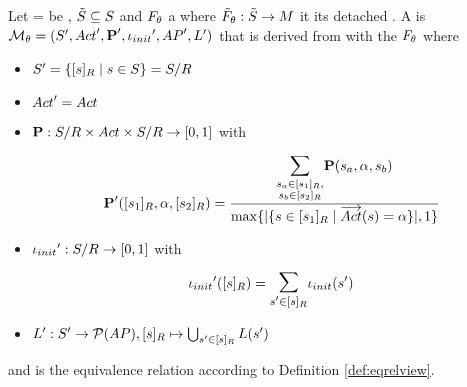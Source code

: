 \documentclass[preview]{standalone}
\begin{document}
\begin{definition}
	
	Let \chgph = \chgphtuple be \chgphN, ${\tilde{{S}}} \subseteq {S}$ and ${F_{{\theta}}}$ a \grpfctN where ${\tilde{F}_{{\theta}}} : {\tilde{{S}}} \to {\ensuremath{{M}}}$ it its detached \grpfctN. A \emph{\viewN} is \achgphN ${{{{\mathcal{M}}}}_{{\theta}}} = {{({S}', {Act}', {\textbf{P}}', {\iota_{init}}', {AP}', {L}')}}$ that is derived from \mdp with the \grpfctN ${F_{{\theta}}}$ where
	
	\begin{itemize}
				\item ${S}' = \{ {[{s}]_{{R}}} \mid {s} \in {S} \} = {{{S}}/{R}}$
				
				\item ${Act}' = {Act}$
				
				
				\item ${\textbf{P}} : {{{S}}/{R}} \times {Act} \times {{\ensuremath{{S}}}/\ensuremath{{R}}} \to [0,1]$ with 
				\[ 
				\probtfunc'(\eqclassv[\state_1], \action, \eqclassv[\state_2]) = 
				\frac
				{\bbigsum{\substack{\state_a \in \eqclassv[\state_1], \\ \state_b \in \eqclassv[\state_2]}}\probtfunc(\state_a, \action, \state_b) }
				{
					\max\{|\{\state \in \eqclassv[\state_1] \mid \outacts(\state) = \action\}|, 1\}
					}
				\]
				
				
				\item ${\iota_{init}}' : {{{S}}/{R}} \to [0,1]$ with 
				\[
				\initdistrib'(\eqclassv) = \bbigsum{\state' \in \eqclassv} \initdistrib(\state')
				\]
							
				\item ${L}': {S}' \to {\mathcal{P}(\ensuremath{{AP}})}, {{[{s}]_{{R}}}} \mapsto \bigcup_{{s}' \in {\ensuremath{{[{s}]_{{R}}}}}} {L}({s}')$
				
			\end{itemize}
	and \eqrelview is the equivalence relation according to Definition \ref{def:eqrelview}.
	

	\label{def:view}	
\end{definition}
\end{document}
